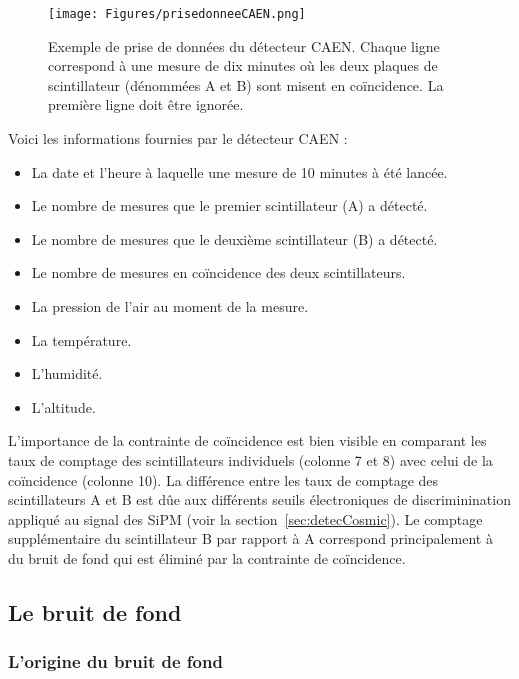 \documentclass[a4paper, 12pt]{article}
\begin{document}
\begin{spacing}{1.5}
\begin{figure}[t]
\begin{center}
\texttt{[image: Figures/prisedonneeCAEN.png]}
\caption{\label{fig:PrisedonneeCAEN} Exemple de prise de données du détecteur CAEN. Chaque ligne correspond à une mesure de dix minutes où les deux plaques de scintillateur (dénommées A et B) sont misent en coïncidence. La première ligne doit être ignorée.}
\end{center}
\end{figure}

Voici les informations fournies par le détecteur CAEN :
\begin{itemize}
  \item La date et l'heure à laquelle une mesure de 10 minutes à été lancée.
  \item Le nombre de mesures que le premier scintillateur (A) a détecté.
  \item Le nombre de mesures que le deuxième scintillateur (B) a détecté.
  \item Le nombre de mesures en coïncidence des deux scintillateurs.
  \item La pression de l'air au moment de la mesure.
  \item La température.
  \item L'humidité.
  \item L'altitude.
\end{itemize}
L'importance de la contrainte de coïncidence est bien visible en comparant les taux de comptage des scintillateurs individuels (colonne 7 et 8) avec celui de la coïncidence (colonne 10). La différence entre les taux de comptage des scintillateurs A et B est dûe aux différents seuils électroniques de discriminination appliqué au signal des SiPM (voir la section~\ref{sec:detecCosmic}). Le comptage supplémentaire du scintillateur B par rapport à A correspond principalement à du bruit de fond qui est éliminé par la contrainte de coïncidence.

\subsection{Le bruit de fond}
\subsubsection{L'origine du bruit de fond}


\end{spacing}
\end{document}
